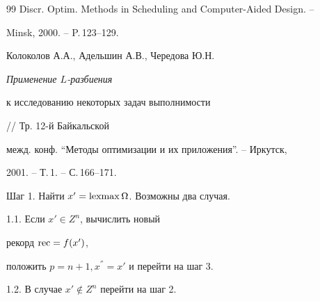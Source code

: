 \begin{thebibliography}{99}
Discr. Optim. Methods in Scheduling and Computer-Aided Design. --


Minsk, 2000. -- P.\,123--129.




Колоколов А.А., Адельшин А.В., Чередова Ю.Н. {\em Применение $L$-разбиения


к исследованию некоторых задач выполнимости} // Тр. 12-й Байкальской


межд. конф. ``Методы оптимизации и их приложения''. -- Иркутск,


2001. -- Т.\,1. -- С.\,166--171.





\end{thebibliography}





\vskip 2cm














\label{end}














\noindent{}Шаг 1. Найти $x' = \operatorname{lexmax} \Omega$. Возможны два случая.





\hspace{10mm} 1.1. Если $x' \in Z^{n}$, вычислить новый 


рекорд $\operatorname{rec} = f(x')$,





\hspace{17mm} положить $p = n + 1, x^{''} = x'$  и перейти на шаг 3.





\hspace{10mm} 1.2. В случае $x' \notin Z^{n}$ перейти на шаг 2.








